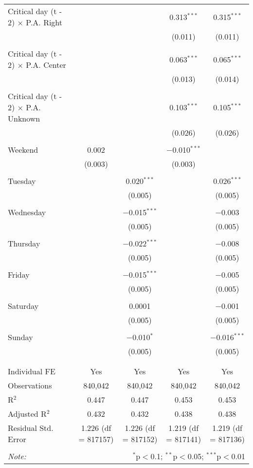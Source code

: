 \documentclass[
]{article}
\begin{document}
\begin{table}[!htbp]
{\begin{tabular}{@{\extracolsep{5pt}}lcccc}
 Critical day (t - 2) $\times$ P.A. Right &  &  & 0.313$^{***}$ & 0.315$^{***}$ \\ 
  &  &  & (0.011) & (0.011) \\ 
  & & & & \\ 
 Critical day (t - 2) $\times$ P.A. Center &  &  & 0.063$^{***}$ & 0.065$^{***}$ \\ 
  &  &  & (0.013) & (0.014) \\ 
  & & & & \\ 
 Critical day (t - 2) $\times$ P.A. Unknown &  &  & 0.103$^{***}$ & 0.105$^{***}$ \\ 
  &  &  & (0.026) & (0.026) \\ 
  & & & & \\ 
 Weekend & 0.002 &  & $-$0.010$^{***}$ &  \\ 
  & (0.003) &  & (0.003) &  \\ 
  & & & & \\ 
 Tuesday &  & 0.020$^{***}$ &  & 0.026$^{***}$ \\ 
  &  & (0.005) &  & (0.005) \\ 
  & & & & \\ 
 Wednesday &  & $-$0.015$^{***}$ &  & $-$0.003 \\ 
  &  & (0.005) &  & (0.005) \\ 
  & & & & \\ 
 Thursday &  & $-$0.022$^{***}$ &  & $-$0.008 \\ 
  &  & (0.005) &  & (0.005) \\ 
  & & & & \\ 
 Friday &  & $-$0.015$^{***}$ &  & $-$0.005 \\ 
  &  & (0.005) &  & (0.005) \\ 
  & & & & \\ 
 Saturday &  & 0.0001 &  & $-$0.001 \\ 
  &  & (0.005) &  & (0.005) \\ 
  & & & & \\ 
 Sunday &  & $-$0.010$^{*}$ &  & $-$0.016$^{***}$ \\ 
  &  & (0.005) &  & (0.005) \\ 
  & & & & \\ 
\hline \\[-1.8ex] 
Individual FE & Yes & Yes & Yes & Yes \\ 
Observations & 840,042 & 840,042 & 840,042 & 840,042 \\ 
R$^{2}$ & 0.447 & 0.447 & 0.453 & 0.453 \\ 
Adjusted R$^{2}$ & 0.432 & 0.432 & 0.438 & 0.438 \\ 
Residual Std. Error & 1.226 (df = 817157) & 1.226 (df = 817152) & 1.219 (df = 817141) & 1.219 (df = 817136) \\ 
\hline 
\hline \\[-1.8ex] 
\textit{Note:}  & \multicolumn{4}{r}{$^{*}$p$<$0.1; $^{**}$p$<$0.05; $^{***}$p$<$0.01} \\ 
\end{tabular}
} 
\end{table} 
\newpage
\end{document}
